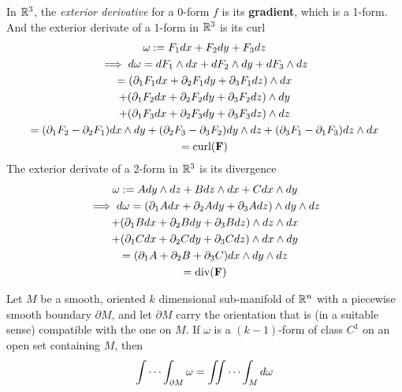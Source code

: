 \documentclass[11pt]{article}
\begin{document}
			\begin{example}
				In $\mathbb{R}^3$, the \emph{exterior derivative} for a 0-form $f$ is its \textbf{gradient}, which is a 1-form. \\
				And the exterior derivate of a 1-form in $\mathbb{R}^3$ is its curl 
				\begin{gather}
					\omega := F_1 dx + F_2 dy + F_3 dz \\
					\implies d\omega = dF_1 \land dx + dF_2 \land dy + dF_3 \land dz \\
					= (\partial_1 F_1 dx + \partial_2 F_1 dy + \partial_3 F_1 dz) \land dx \\
					+ (\partial_1 F_2 dx + \partial_2 F_2 dy + \partial_3 F_2 dz) \land dy \\
					+ (\partial_1 F_3 dx + \partial_2 F_3 dy + \partial_3 F_3 dz) \land dz \\
					= (\partial_1 F_2 - \partial_2 F_1) dx \land dy 
					+ (\partial_2 F_3 - \partial_3 F_2) dy \land dz
					+ (\partial_3 F_1 - \partial_1 F_3) dz \land dx \\
					= \text{curl}(\textbf{F})
				\end{gather}
				The exterior derivate of a 2-form in $\mathbb{R}^3$ is its divergence
				\begin{gather}
					\omega := A dy \land dz + B dz \land dx + C dx \land dy\\
					\implies d \omega = (\partial_1 A dx + \partial_2 A dy + \partial_3 A dz) \land dy \land dz \\
					+ (\partial_1 B dx + \partial_2 B dy + \partial_3 B dz) \land dz \land dx \\
					+ (\partial_1 C dx + \partial_2 C dy + \partial_3 C dz) \land dx \land dy \\
					= (\partial_1 A + \partial_2 B + \partial_3 C) dx \land dy \land dz \\
					= \text{div}(\textbf{F})
				\end{gather}
			\end{example}
			
			\begin{theorem}
				Let $M$ be a smooth, oriented $k$ dimensional sub-manifold of $\mathbb{R}^n$ with a piecewise smooth boundary $\partial M$, and let $\partial M$ carry the orientation that is (in a suitable sense) compatible with the one on $M$. If $\omega$ is a $(k-1)$-form of class $C^1$ on an open set containing $M$, then
				\begin{equation}
					\idotsint_{\partial M} \omega = \iint \cdots \int_M d\omega
				\end{equation}
			\end{theorem}
			
\end{document}
